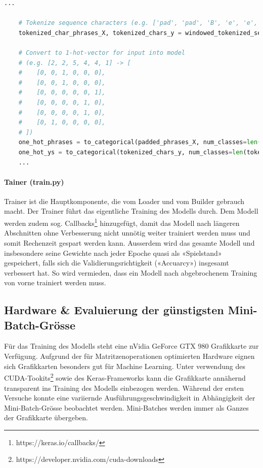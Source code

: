 \begin{lstlisting}[language=Python, caption=Encodierung von Zeichen bis One-Hot-Vektor, label=lst:one-hot-encoding]
    ...

    # Tokenize sequence characters (e.g. ['pad', 'pad', 'B', 'e', 'e', 'r'] -> [2, 2, 5, 4, 4, 1])
    tokenized_char_phrases_X, tokenized_chars_y = windowed_tokenized_sequences[:, :-1], windowed_tokenized_sequences[:, -1]

    # Convert to 1-hot-vector for input into model
    # (e.g. [2, 2, 5, 4, 4, 1] -> [
    #    [0, 0, 1, 0, 0, 0],
    #    [0, 0, 1, 0, 0, 0],
    #    [0, 0, 0, 0, 0, 1],
    #    [0, 0, 0, 0, 1, 0],
    #    [0, 0, 0, 0, 1, 0],
    #    [0, 1, 0, 0, 0, 0],
    # ])
    one_hot_phrases = to_categorical(padded_phrases_X, num_classes=len(tokenizer.index_word) + 1)
    one_hot_ys = to_categorical(tokenized_chars_y, num_classes=len(tokenizer.index_word) + 1)
    ...
\end{lstlisting}


\paragraph{Tainer (train.py)} Trainer ist die Hauptkomponente, die vom Loader und vom Builder gebrauch macht.
Der Trainer führt das eigentliche Training des Modells durch.
Dem Modell werden zudem sog. Callbacks\footnote{https://keras.io/callbacks/} hinzugefügt, damit das Modell nach
längeren Abschnitten ohne Verbesserung nicht unnötig weiter trainiert werden muss und somit Rechenzeit gespart werden kann.
Ausserdem wird das gesamte Modell und insbesondere seine Gewichte nach jeder Epoche quasi als «Spielstand» gespeichert,
falls sich die Validierungsrichtigkeit («Accuarcy») insgesamt verbessert hat.
So wird vermieden, dass ein Modell nach abgebrochenem Training von vorne trainiert werden muss.

\subsection{Hardware \& Evaluierung der günstigsten Mini-Batch-Grösse}
\label{sec:evaluating-fastest-batchsize}
Für das Training des Modells steht eine nVidia GeForce GTX 980 Grafikkarte zur Verfügung.
Aufgrund der für Matritzenoperationen optimierten Hardware eignen sich Grafikkarten besonders gut für Machine Learning.
Unter verwendung des CUDA-Tookits\footnote{https://developer.nvidia.com/cuda-downloads} sowie des Keras-Frameworks kann
die Grafikkarte annähernd transparent ins Training des Modells einbezogen werden.
Während der ersten Versuche konnte eine variiernde Ausführungsgeschwindigkeit in Abhängigkeit der Mini-Batch-Grösse beobachtet werden.
Mini-Batches werden immer als Ganzes der Grafikkarte übergeben.

